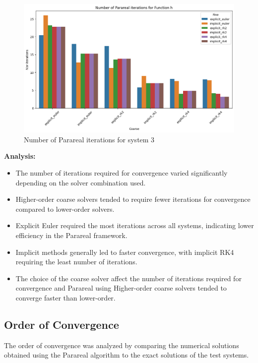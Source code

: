 \documentclass[a4paper,12pt,french]{article}
\begin{document}
\begin{figure}[ht!]
    \centering
    \includegraphics[width=.85\textwidth]{img/nbr_iter_h.png}
    \caption{Number of Parareal iterations for system 3}
    \label{fig:3}
\end{figure}

\newpage
\textbf{Analysis:}
\begin{itemize}
    \item The number of iterations required for convergence varied significantly depending on the solver combination used.
    \item Higher-order coarse solvers tended to require fewer iterations for convergence compared to lower-order solvers.
    \item Explicit Euler required the most iterations across all systems, indicating lower efficiency in the Parareal framework.
    \item Implicit methods generally led to faster convergence, with implicit RK4 requiring the least number of iterations.
    \item The choice of the coarse solver affect the number of iterations required for convergence and Parareal using Higher-order coarse solvers tended to converge faster than lower-order.
\end{itemize}
\subsection{Order of Convergence}
The order of convergence was analyzed by comparing the numerical solutions obtained using the Parareal algorithm to the exact solutions of the test systems.
\end{document}
